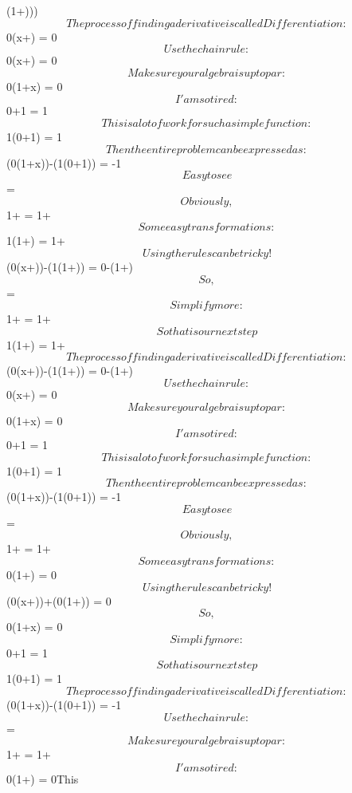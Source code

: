\documentclass[12pt]{article}
\begin{document}
(1+)))$$The process of finding a derivative is called Differentiation: $$0\cdot (x+) = 0$$Use the chain rule: $$0\cdot (x+) = 0$$Make sure your algebra is up to par: $$0\cdot (1+x) = 0$$I'am so tired: $$0+1 = 1$$This is a lot of work for such a simple function: $$1\cdot (0+1) = 1$$Then the entire problem can be expressed as: $$(0\cdot (1+x))-(1\cdot (0+1)) = -1$$Easy to see$$ = $$Obviously, $$1+ = 1+$$Some easy transformations: $$1\cdot (1+) = 1+$$Using the rules can be tricky!$$(0\cdot (x+))-(1\cdot (1+)) = 0-(1+)$$So, $$ = $$Simplify more: $$1+ = 1+$$So that is our next step$$1\cdot (1+) = 1+$$The process of finding a derivative is called Differentiation: $$(0\cdot (x+))-(1\cdot (1+)) = 0-(1+)$$Use the chain rule: $$0\cdot (x+) = 0$$Make sure your algebra is up to par: $$0\cdot (1+x) = 0$$I'am so tired: $$0+1 = 1$$This is a lot of work for such a simple function: $$1\cdot (0+1) = 1$$Then the entire problem can be expressed as: $$(0\cdot (1+x))-(1\cdot (0+1)) = -1$$Easy to see$$ = $$Obviously, $$1+ = 1+$$Some easy transformations: $$0\cdot (1+) = 0$$Using the rules can be tricky!$$(0\cdot (x+))+(0\cdot (1+)) = 0$$So, $$0\cdot (1+x) = 0$$Simplify more: $$0+1 = 1$$So that is our next step$$1\cdot (0+1) = 1$$The process of finding a derivative is called Differentiation: $$(0\cdot (1+x))-(1\cdot (0+1)) = -1$$Use the chain rule: $$ = $$Make sure your algebra is up to par: $$1+ = 1+$$I'am so tired: $$0\cdot (1+) = 0$$This 
\end{document}
